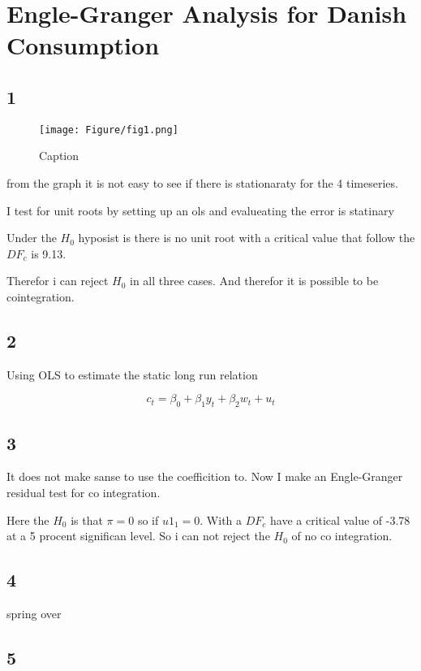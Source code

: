 \documentclass[12pt]{article}
\begin{document}
{\selectfont


\section{Engle-Granger Analysis for Danish Consumption}


\subsection{1}


\begin{figure}[h!]
    \centering
    \texttt{[image: Figure/fig1.png]}
    \caption{Caption}
    \label{fig:my_label}
\end{figure}

from the graph it is not easy to see if there is stationaraty for the 4 timeseries.

\newpage

I test for unit roots by setting up an ols and evalueating the error is statinary




Under the $H_0$ hyposist is there is no unit root with a critical value that follow the $DF_c$ is 9.13.

Therefor i can reject $H_0$ in all three cases. And therefor it is possible to be cointegration. 

\newpage


\subsection{2}

Using OLS to estimate the static long run relation 


\begin{equation}
    c_t = \beta_0 + \beta_1 y_t + \beta_2 w_t + u_t
\end{equation}




\newpage
\subsection{3}



It does not make sanse to use the coefficition to. Now I make an Engle-Granger residual test for co integration. 


Here the $H_0$ is that $\pi = 0$ so if $u1_1 = 0$. With a $DF_c$ have a critical value of -3.78 at a 5 procent significan level. So i can not reject the $H_0$ of no co integration.








\subsection{4}

spring over

\subsection{5}





}
\end{document}
